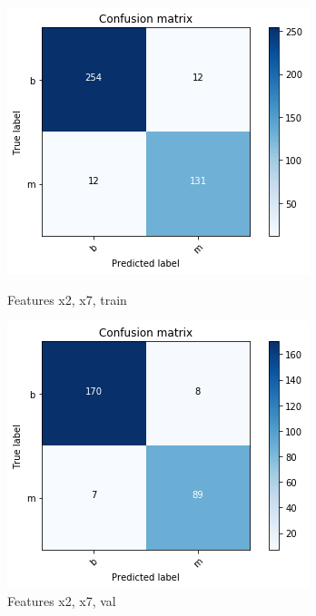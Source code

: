 \documentclass[11pt,a4paper]{article}
\begin{document}
\begin{enumerate}
\begin{enumerate}
		\begin{figure}[H]\centering
			\begin{minipage}{0.49\textwidth}
				\includegraphics[width=\linewidth]{figures/conf_train_x2_x7.png}
				\caption{Features x2, x7, train}\label{fig:conf_train_x2_x7.png}
			\end{minipage}
			\begin{minipage}{0.49\textwidth}
				\includegraphics[width=\linewidth]{figures/conf_val_x2_x7.png}
				\caption{Features x2, x7, val}\label{fig:conf_val_x2_x7.png}
			\end{minipage}
		\end{figure}
		

\end{enumerate}
\end{enumerate}
\end{document}
